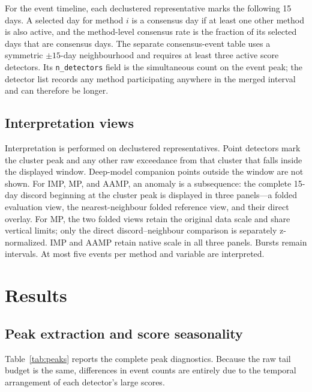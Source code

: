 \documentclass[11pt,a4paper]{article}
\begin{document}
For the event timeline, each declustered representative marks the following 15
days. A selected day for method $i$ is a consensus day if at least one other
method is also active, and the method-level consensus rate is the fraction of
its selected days that are consensus days. The separate consensus-event table
uses a symmetric $\pm15$-day neighbourhood and requires at least three active
score detectors. Its \texttt{n\_detectors} field is the simultaneous count on
the event peak; the detector list records any method participating anywhere in
the merged interval and can therefore be longer.

\subsection{Interpretation views}
Interpretation is performed on declustered representatives. Point detectors
mark the cluster peak and any other raw exceedance from that cluster that falls
inside the displayed window. Deep-model companion points outside the window
are not shown. For IMP, MP, and AAMP, an anomaly is a subsequence: the complete
15-day discord beginning at the cluster peak is displayed in three panels---a
folded evaluation view, the nearest-neighbour folded reference view, and their direct
overlay. For MP, the two folded views retain the original data scale and share
vertical limits; only the direct discord--neighbour comparison is separately
z-normalized. IMP and AAMP retain native scale in all three panels. Bursts
remain intervals. At most five events per method and variable are interpreted.

\section{Results}

\subsection{Peak extraction and score seasonality}
Table~\ref{tab:peaks} reports the complete peak diagnostics. Because the raw
tail budget is the same, differences in event counts are entirely due to the
temporal arrangement of each detector's large scores.
\end{document}
